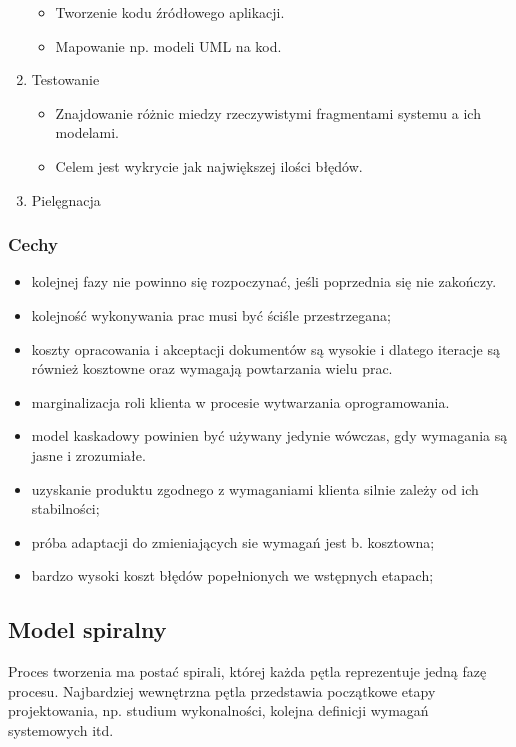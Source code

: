 \documentclass[12pt]{article}
\begin{document}
\begin{enumerate}
\begin{itemize}
                \item Tworzenie kodu źródłowego aplikacji.
                \item Mapowanie np. modeli UML na kod.
            \end{itemize}
        \item Testowanie
            \begin{itemize}
                \item Znajdowanie różnic miedzy rzeczywistymi fragmentami systemu a ich modelami.
                \item Celem jest wykrycie jak największej ilości błędów.
            \end{itemize}
        \item Pielęgnacja
    \end{enumerate}
    
    \subsubsection{Cechy}
    \begin{itemize}
        \item kolejnej fazy nie powinno się rozpoczynać, jeśli poprzednia
        się nie zakończy.
        \item kolejność wykonywania prac musi być ściśle przestrzegana;
        \item koszty opracowania i akceptacji dokumentów są wysokie i
        dlatego iteracje są również kosztowne oraz wymagają
        powtarzania wielu prac.
        \item marginalizacja roli klienta w procesie wytwarzania
        oprogramowania.
        \item model kaskadowy powinien być używany jedynie wówczas,
        gdy wymagania są jasne i zrozumiałe.
        \item uzyskanie produktu zgodnego z wymaganiami klienta silnie
        zależy od ich stabilności;
        \item próba adaptacji do zmieniających sie wymagań jest b.
        kosztowna;
        \item bardzo wysoki koszt błędów popełnionych we wstępnych
        etapach;
    \end{itemize}
    
    \subsection{Model spiralny}
    Proces tworzenia ma postać spirali, której każda pętla reprezentuje jedną fazę procesu. Najbardziej wewnętrzna pętla przedstawia początkowe etapy projektowania, np. studium wykonalności, kolejna definicji wymagań systemowych itd.
    
\end{document}
